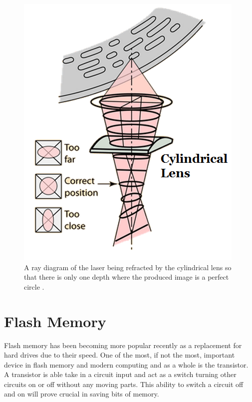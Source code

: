 \documentclass[ notitlepage, numerical, 11pt]{revtex4-1} %
\begin{document}
\begin{figure}[H]
\centerline{\includegraphics[scale=.5]{rayDiagram.png}}
\caption{A ray diagram of the laser being refracted by the cylindrical lens so that there is only one depth where the produced image is a perfect circle \cite {hyper}.}
\label{focus2}
\end{figure} 

\section{Flash Memory}
Flash memory has been becoming more popular recently as a replacement for hard drives due to their speed. One of the most, if not the most, important device in flash memory and modern computing and as a whole is the transistor. A transistor is able take in a circuit input and act as a switch turning other circuits on or off without any moving parts. This ability to switch a circuit off and on will prove crucial in saving bits of memory.
\end{document}
